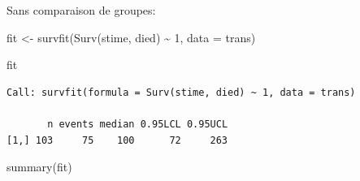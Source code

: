 \documentclass[
  12pt,
  letterpaper,
  DIV=11,
  numbers=noendperiod,
  onepage,
  openany]{scrreprt}
\newenvironment{Shaded}{\begin{snugshade}}{\end{snugshade}}
\newcommand{\AttributeTok}[1]{\textcolor[rgb]{0.80,0.80,0.80}{#1}}
\newcommand{\DecValTok}[1]{\textcolor[rgb]{0.86,0.86,0.80}{#1}}
\newcommand{\FunctionTok}[1]{\textcolor[rgb]{0.94,0.94,0.56}{#1}}
\newcommand{\NormalTok}[1]{\textcolor[rgb]{0.80,0.80,0.80}{#1}}
\newcommand{\OtherTok}[1]{\textcolor[rgb]{0.94,0.94,0.56}{#1}}
\newcommand{\SpecialCharTok}[1]{\textcolor[rgb]{0.86,0.64,0.64}{#1}}
\begin{document}
Sans comparaison de groupes:

\begin{Shaded}
\begin{Highlighting}[]
\NormalTok{fit }\OtherTok{\textless{}{-}} \FunctionTok{survfit}\NormalTok{(}\FunctionTok{Surv}\NormalTok{(stime, died) }\SpecialCharTok{\textasciitilde{}} \DecValTok{1}\NormalTok{, }\AttributeTok{data =}\NormalTok{ trans)}

\NormalTok{fit}
\end{Highlighting}
\end{Shaded}

\begin{verbatim}
Call: survfit(formula = Surv(stime, died) ~ 1, data = trans)

       n events median 0.95LCL 0.95UCL
[1,] 103     75    100      72     263
\end{verbatim}

\begin{Shaded}
\begin{Highlighting}[]
\FunctionTok{summary}\NormalTok{(fit)}
\end{Highlighting}
\end{Shaded}
\end{document}
